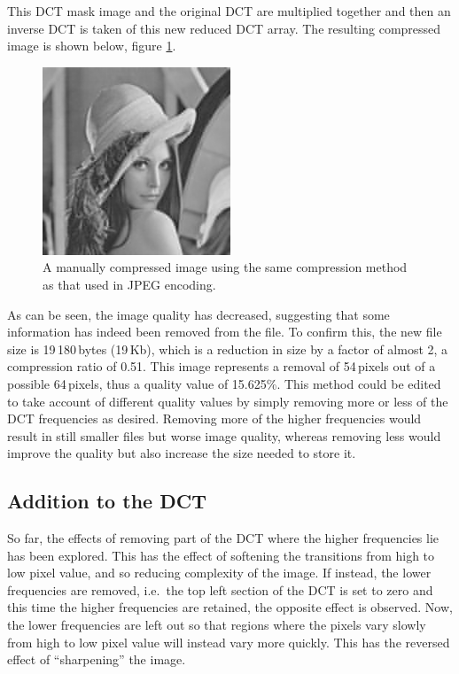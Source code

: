 This DCT mask image and the original DCT are multiplied together and then an inverse DCT is taken of this new reduced DCT array. The resulting compressed image is shown below, figure \ref{fig:mancompresslena}.
\begin{figure}[ht]
	\centering
	\includegraphics[width=0.5\textwidth]{lena_manual_compression.jpg}
	\caption{A manually compressed image using the same compression method as that used in JPEG encoding.\label{fig:mancompresslena}}
\end{figure}

As can be seen, the image quality has decreased, suggesting that some information has indeed been removed from the file. To confirm this, the new file size is 19\,180\,bytes (19\,Kb), which is a reduction in size by a factor of almost 2, a compression ratio of 0.51. This image represents a removal of 54\,pixels out of a possible 64\,pixels, thus a quality value of 15.625\%. This method could be edited to take account of different quality values by simply removing more or less of the DCT frequencies as desired. Removing more of the higher frequencies would result in still smaller files but worse image quality, whereas removing less would improve the quality but also increase the size needed to store it.

\subsection{Addition to the DCT} %
\label{sub:addition_to_the_dct}
So far, the effects of removing part of the DCT where the higher frequencies lie has been explored. This has the effect of softening the transitions from high to low pixel value, and so reducing complexity of the image. If instead, the lower frequencies are removed, i.e.\ the top left section of the DCT is set to zero and this time the higher frequencies are retained, the opposite effect is observed. Now, the lower frequencies are left out so that regions where the pixels vary slowly from high to low pixel value will instead vary more quickly. This has the reversed effect of ``sharpening'' the image.

